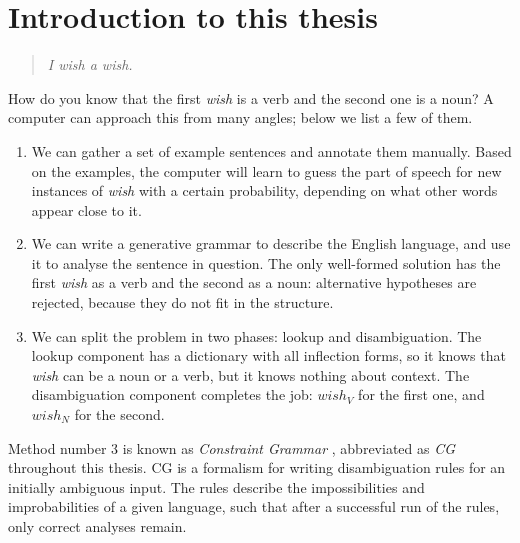 \chapter{Introduction to this thesis}


\begin{quote}
\emph{I wish a wish.}
\end{quote}

\noindent How do you know that the first \emph{wish} is a verb and the second one is a noun? A computer can approach this from many angles; below we list a few of them.

\begin{enumerate}
\item We can gather a set of example sentences and annotate them manually. %
Based on the examples, the computer will learn to guess the 
part of speech for new instances of \emph{wish} with a certain probability, 
depending on what other words appear close to it.

\item We can write a generative grammar to describe the English language, and use it to analyse the sentence in question.
The only well-formed solution has the first \emph{wish} as a verb and the second as a noun: alternative hypotheses are rejected, 
because they do not fit in the structure.


\item We can split the problem in two phases: lookup and disambiguation.
The lookup component has a dictionary with all inflection forms, so it knows that 
\emph{wish} can be a noun or a verb, but it knows nothing about context.
The disambiguation component completes the job: $wish_V$ for the first one, and $wish_N$ for the second.
\end{enumerate}

Method number 3 is known as \emph{Constraint Grammar} \cite{karlsson1995constraint}, abbreviated as \emph{CG} throughout this thesis. 
CG is a formalism for writing disambiguation rules for an initially ambiguous input. The rules describe the impossibilities and improbabilities of a given language, such that after a successful run of the rules, only correct analyses remain.

